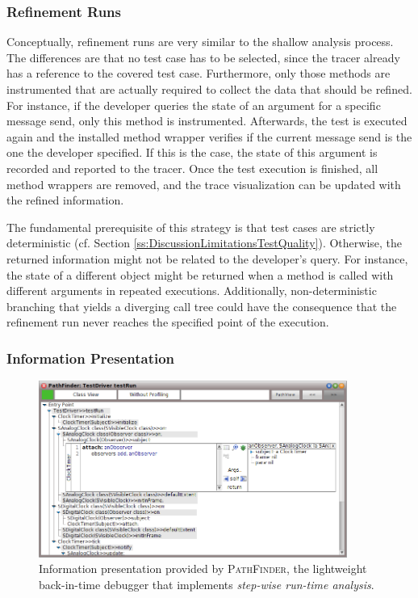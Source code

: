 \subsubsection{Refinement Runs}
Conceptually, refinement runs are very similar to the shallow analysis process.
The differences are that no test case has to be selected, since the tracer already has a reference to the covered test case.
Furthermore, only those methods are instrumented that are actually required to collect the data that should be refined.
For instance, if the developer queries the state of an argument for a specific message send, only this method is instrumented.
Afterwards, the test is executed again and the installed method wrapper verifies if the current message send is the one the developer specified.
If this is the case, the state of this argument is recorded and reported to the tracer.
Once the test execution is finished, all method wrappers are removed, and the trace visualization can be updated with the refined information.

The fundamental prerequisite of this strategy is that test cases are strictly deterministic (cf. Section \ref{ss:DiscussionLimitationsTestQuality}).
Otherwise, the returned information might not be related to the developer's query.
For instance, the state of a different object might be returned when a method is called with different arguments in repeated executions.
Additionally, non-deterministic branching that yields a diverging call tree could have the consequence that the refinement run never reaches the specified point of the execution.

\subsubsection{Information Presentation}

\begin{figure}[tb]
	\centering
	\includegraphics[width=0.9\textwidth]{../images/02-TracingPathFinder}
	\caption[Information Presentation Provided by PathFinder]{Information presentation provided by \textsc{PathFinder}, the lightweight back-in-time debugger that implements \emph{step-wise run-time analysis}.}
	\label{fig:BackgroundPathFinder}
\end{figure}

